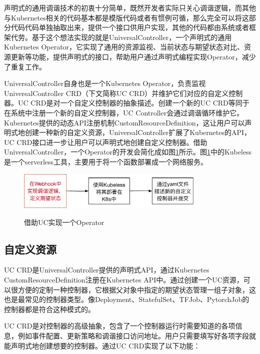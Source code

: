 \documentclass[macfonts,master]{njuthesis}
\begin{document}
声明式的通用调谐技术的初衷十分简单，既然开发者实际只关心调谐逻辑，而其他与Kubernetes相关的代码基本都是模版代码或者有惯例可循，那么完全可以将这部分代码代码单独抽取出来，提供一个接口供用户实现，其他的代码都由系统或者框架代劳。基于这个想法实现的就是UniversalController，一个声明式的通用Kubernetes Operator，它实现了通用的资源监视、当前状态与期望状态对比、资源更新等功能，提供声明式的接口，帮助用户通过声明式编程实现Operator，减少了重复工作。

UniversalController自身也是一个Kubernetes Operator，负责监视UniversalController CRD（下文简称UC CRD）并维护它们对应的自定义控制器。UC CRD是对一个自定义控制器的抽象描述。创建一个新的UC CRD等同于在系统中注册一个新的自定义控制器，UC Controller会通过调谐循环维护它。Kubernetes提供的动态API注册机制CustomResourceDefinition，这让用户可以声明式地创建一种新的自定义资源，UniversalController扩展了Kubernetes的API，UC CRD接口进一步让用户可以声明式地创建自定义控制器。借助UniversalController，一个Operator的开发会简化成如图\ref{fig:uc-coding-operator}所示。图\ref{fig:uc-coding-operator}中的Kubeless是一个serverless工具，主要用于将一个函数部署成一个网络服务。

\begin{figure}[htbp]
  \centering
  \includegraphics[width=0.8\textwidth]{pics/uc-coding-operator.pdf}\\
  \caption{借助UC实现一个Operator}\label{fig:uc-coding-operator}
\end{figure}


\subsection{自定义资源}

UC CRD是UniversalController提供的声明式API，通过Kubernetes CustomResourceDefinition注册在Kubernetes API中。通过创建一个UC资源，可以很方便的定制一种控制器，它根据父对象中指定的期望状态管理一组子对象，这也是最常见的控制器类型。像Deployment、StatefulSet、TFJob、PytorchJob的控制器都是符合这种模式的。

UC CRD是对控制器的高级抽象，包含了一个控制器运行时需要知道的各项信息，例如事件配置、更新策略和调谐接口访问地址。用户只需要填写好各项字段就能声明式地创建想要的控制器。通过UC CRD实现了以下功能：
\end{document}
